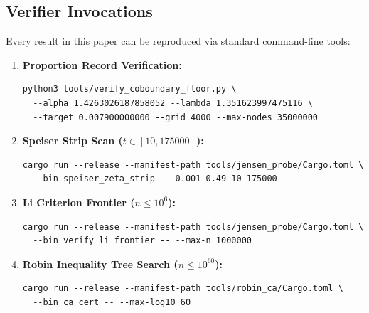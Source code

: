 \documentclass[11pt,a4paper]{article}
\theoremstyle{remark}
\begin{document}
\subsection{Verifier Invocations}
Every result in this paper can be reproduced via standard command-line tools:
\begin{enumerate}
\item \textbf{Proportion Record Verification:}
\begin{verbatim}
python3 tools/verify_coboundary_floor.py \
  --alpha 1.4263026187858052 --lambda 1.351623997475116 \
  --target 0.007900000000 --grid 4000 --max-nodes 35000000
\end{verbatim}
\item \textbf{Speiser Strip Scan ($t \in [10, 175000]$):}
\begin{verbatim}
cargo run --release --manifest-path tools/jensen_probe/Cargo.toml \
  --bin speiser_zeta_strip -- 0.001 0.49 10 175000
\end{verbatim}
\item \textbf{Li Criterion Frontier ($n \le 10^6$):}
\begin{verbatim}
cargo run --release --manifest-path tools/jensen_probe/Cargo.toml \
  --bin verify_li_frontier -- --max-n 1000000
\end{verbatim}
\item \textbf{Robin Inequality Tree Search ($n \le 10^{60}$):}
\begin{verbatim}
cargo run --release --manifest-path tools/robin_ca/Cargo.toml \
  --bin ca_cert -- --max-log10 60
\end{verbatim}
\end{enumerate}



\end{document}
